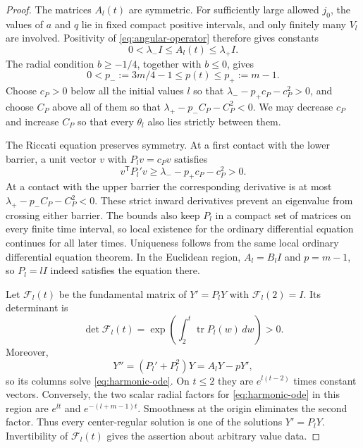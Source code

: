 \begin{proof}
The matrices \(A_l(t)\) are symmetric.  For sufficiently large
allowed \(j_0\), the values of \(a\) and \(q\) lie in fixed compact
positive intervals, and only finitely many \(V_l\) are involved.
Positivity of \eqref{eq:angular-operator} therefore gives constants
\[
 0<\lambda_-I\leq A_l(t)\leq\lambda_+I.
\]
The radial condition \(b\geq-1/4\), together with \(b\leq0\), gives
\[
 0<p_-:=3m/4-1\leq p(t)\leq p_+:=m-1.
\]
Choose \(c_P>0\) below all the initial values \(l\) so that
\(\lambda_--p_+c_P-c_P^2>0\), and choose \(C_P\) above all of
them so that \(\lambda_+-p_-C_P-C_P^2<0\).  We may decrease
\(c_P\) and increase \(C_P\) so that every \(\theta_l\) also lies
strictly between them.

The Riccati equation preserves symmetry.  At a first contact with
the lower barrier, a unit vector \(v\) with \(P_lv=c_Pv\) satisfies
\[
 v^{\mathsf T}P_l'v
 \geq\lambda_--p_+c_P-c_P^2>0.
\]
At a contact with the upper barrier the corresponding derivative
is at most \(\lambda_+-p_-C_P-C_P^2<0\).  These strict inward
derivatives prevent an eigenvalue from crossing either barrier.
The bounds also keep \(P_l\) in a compact set of matrices on every
finite time interval, so local existence for the ordinary
differential equation continues for all later times.  Uniqueness follows
from the same local ordinary differential equation theorem.  In the
Euclidean region, \(A_l=B_lI\) and \(p=m-1\), so \(P_l=lI\)
indeed satisfies the equation there.

Let \(\mathcal F_l(t)\) be the fundamental matrix of \(Y'=P_lY\)
with \(\mathcal F_l(2)=I\).  Its determinant is
\[
 \det\mathcal F_l(t)
 =\exp\left(\int_2^t\operatorname{tr}P_l(w)\,dw\right)>0.
\]
Moreover,
\[
 Y''=(P_l'+P_l^2)Y=A_lY-pY',
\]
so its columns solve \eqref{eq:harmonic-ode}.  On \(t\leq2\)
they are \(e^{l(t-2)}\) times constant vectors.  Conversely, the
two scalar radial factors for \eqref{eq:harmonic-ode} in this
region are \(e^{lt}\) and \(e^{-(l+m-1)t}\).  Smoothness at the
origin eliminates the second factor.  Thus every center-regular
solution is one of the solutions \(Y'=P_lY\).  Invertibility of
\(\mathcal F_l(t)\) gives the assertion about arbitrary value data.


\end{proof}
